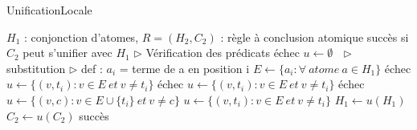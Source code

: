 \begin{center}
\begin{algorithm}[H]
\caption{UnificationLocale}\label{algo_unificationlocale}
\begin{algorithmic}[1]
\REQUIRE $H_{1}$ : conjonction d'atomes, $R = (H_{2},C_{2})$ : r\`egle \`a conclusion atomique 
\ENSURE succ\`es si $C_{2}$ peut s'unifier avec $H_{1}$ 
\STATE $\triangleright$ V\'erification des pr\'edicats
		\RETURN \'echec
	\ENDIF
\ENDFOR
\STATE $u \leftarrow \emptyset\ \ \ \triangleright$ substitution 
	\STATE $\triangleright$ def : $a_{i}$ = terme de a en position i
	\STATE $E \leftarrow \{a_{i} : \forall\ atome\ a \in H_{1}\}$
			\RETURN \'echec
		\ELSE
			\STATE $u \leftarrow \{(v,t_{i}) : v \in E\ et\ v \neq t_{i}\}$
		\ENDIF
			\RETURN \'echec
		\ELSE
			\STATE $u \leftarrow \{(v,t_{i}) : v \in E\ et\ v \neq t_{i}\}$
		\ENDIF
	\ELSE
			\RETURN \'echec
			\STATE $u \leftarrow \{(v,c) : v \in E \cup \{t_{i}\}\ et\ v \neq c\}$
		\ELSE
			\STATE $u \leftarrow \{(v,t_{i}) : v \in E\ et\ v \neq t_{i}\}$
		\ENDIF
	\ENDIF	
	\STATE $H_{1} \leftarrow u(H_{1})$
	\STATE $C_{2} \leftarrow u(C_{2})$
\ENDFOR
\RETURN succ\`es 

\end{algorithmic}
\end{algorithm}
\end{center}

